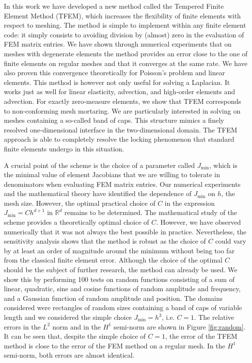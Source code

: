 \documentclass{article}
\theoremstyle{remark}
\newcommand{\Jmin}{J_{\text{min}}}
\begin{document}
In this work we have developed a new method called the Tempered Finite Element Method (TFEM), which increases the flexibility of finite elements with respect to meshing. The method is simple to implement within any finite element code: it simply consists to avoiding division by (almost) zero in the evaluation of FEM matrix entries. We have shown through numerical experiments that on meshes with degenerate elements the method provides an error close to the one of finite elements on regular meshes and that it converges at the same rate. We have also proven this convergence theoretically for Poisson's problem and linear elements. This method is however not only useful for solving a Laplacian. It works just as well for linear elasticity, advection, and high-order elements and advection. For exactly zero-measure elements, we show that TFEM corresponds to non-conforming mesh mortaring. We are particularly interested in solving on meshes containing a so-called band of caps. This structure mimics a finely resolved one-dimensional interface in the two-dimensional domain. The TFEM approach is able to completely resolve the locking phenomenon that standard finite elements undergo in this situation.

A crucial point of the scheme is the choice of a parameter called $\Jmin$, which is the minimal value of element Jacobians that we are willing to tolerate in denominators when evaluating FEM matrix entries. Our numerical experiments and the mathematical theory have identified the dependence of $\Jmin$ on $h$, the mesh size. However, the optimal practical choice of $C$ in the expression $\Jmin = C h^{d+1}$ in $\mathbb{R}^d$ remains to be determined. The mathematical study of the scheme provides a theoretically optimal choice of $C$. However, we have observed numerically that it was not always the best possible in practice. Nevertheless, the sensitivity analysis shows that the method is robust as the choice of $C$ could vary by at least an order of magnitude around the minimum without being too far from the classical finite element error. Although the choice of the optimal $C$ should be the subject of further research, the method can already be used. We show this by performing 100 tests on random functions consisting of a sum of linear, quadratic, sine and cosine functions of random amplitude and frequency, and a Gaussian function of random amplitude and position. The domains considered were rectangles of random sizes containing a band of caps of variable length and we considered the simple choice $\Jmin = h^3$, i.e. $C=1$. The relative errors in the $L^2$ norm and in the $H^1$ semi-norm are shown in Figure \ref{fig:random}. It can be seen that, despite the simple choice of $C=1$, the error of the TFEM method is close to the error of the FEM method on a regular mesh. In the $H^1$ semi-norm, both errors are almost identical. 
\end{document}
